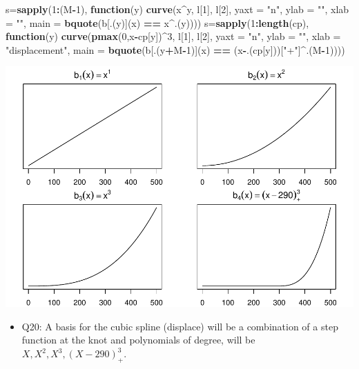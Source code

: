 \documentclass[]{article}
\newenvironment{Shaded}{\begin{snugshade}}{\end{snugshade}}
\newcommand{\KeywordTok}[1]{\textcolor[rgb]{0.13,0.29,0.53}{\textbf{#1}}}
\newcommand{\DataTypeTok}[1]{\textcolor[rgb]{0.13,0.29,0.53}{#1}}
\newcommand{\DecValTok}[1]{\textcolor[rgb]{0.00,0.00,0.81}{#1}}
\newcommand{\StringTok}[1]{\textcolor[rgb]{0.31,0.60,0.02}{#1}}
\newcommand{\ControlFlowTok}[1]{\textcolor[rgb]{0.13,0.29,0.53}{\textbf{#1}}}
\newcommand{\OperatorTok}[1]{\textcolor[rgb]{0.81,0.36,0.00}{\textbf{#1}}}
\newcommand{\NormalTok}[1]{#1}
\providecommand{\tightlist}{%
  \setlength{\itemsep}{0pt}\setlength{\parskip}{0pt}}
\begin{document}
\begin{Shaded}
\begin{Highlighting}[]
\NormalTok{s=}\KeywordTok{sapply}\NormalTok{(}\DecValTok{1}\OperatorTok{:}\NormalTok{(M}\OperatorTok{-}\DecValTok{1}\NormalTok{), }\ControlFlowTok{function}\NormalTok{(y) }\KeywordTok{curve}\NormalTok{(x}\OperatorTok{^}\NormalTok{y, l[}\DecValTok{1}\NormalTok{], l[}\DecValTok{2}\NormalTok{], }\DataTypeTok{yaxt =} \StringTok{"n"}\NormalTok{,}
 \DataTypeTok{ylab =} \StringTok{""}\NormalTok{, }\DataTypeTok{xlab =} \StringTok{""}\NormalTok{, }\DataTypeTok{main =} \KeywordTok{bquote}\NormalTok{(b[.(y)](x) }\OperatorTok{==}\StringTok{ }\NormalTok{x}\OperatorTok{^}\NormalTok{.(y))))}
\NormalTok{s=}\KeywordTok{sapply}\NormalTok{(}\DecValTok{1}\OperatorTok{:}\KeywordTok{length}\NormalTok{(cp), }\ControlFlowTok{function}\NormalTok{(y) }\KeywordTok{curve}\NormalTok{(}\KeywordTok{pmax}\NormalTok{(}\DecValTok{0}\NormalTok{,x}\OperatorTok{-}\NormalTok{cp[y])}\OperatorTok{^}\DecValTok{3}\NormalTok{, l[}\DecValTok{1}\NormalTok{], l[}\DecValTok{2}\NormalTok{], }\DataTypeTok{yaxt =} \StringTok{"n"}\NormalTok{,}
 \DataTypeTok{ylab =} \StringTok{""}\NormalTok{, }\DataTypeTok{xlab =} \StringTok{"displacement"}\NormalTok{, }\DataTypeTok{main =} \KeywordTok{bquote}\NormalTok{(b[.(y}\OperatorTok{+}\NormalTok{M}\OperatorTok{-}\DecValTok{1}\NormalTok{)](x) }\OperatorTok{==}\StringTok{ }\NormalTok{(x}\OperatorTok{-}\NormalTok{.(cp[y]))[}\StringTok{"+"}\NormalTok{]}\OperatorTok{^}\NormalTok{.(M}\OperatorTok{-}\DecValTok{1}\NormalTok{))))}
\end{Highlighting}
\end{Shaded}

\includegraphics{Project2_files/figure-latex/unnamed-chunk-9-2.pdf}

\begin{itemize}
\tightlist
\item
  Q20: A basis for the cubic spline (displace) will be a combination of
  a step function at the knot and polynomials of degree, will be
  \(X, X^2, X^3, (X-290)^3_+\).
\end{itemize}
\end{document}
